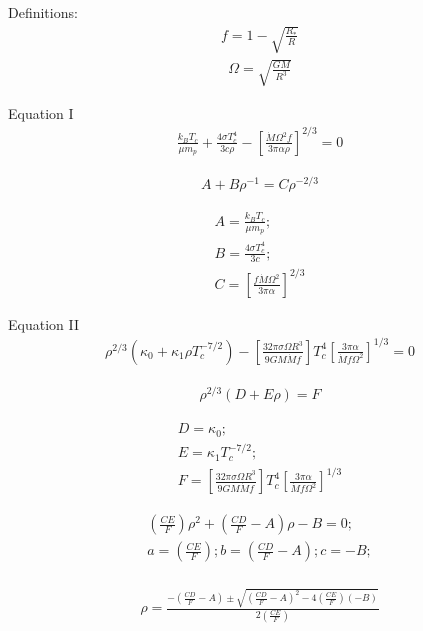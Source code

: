 Definitions:
\begin{align*}
f=1-\sqrt{\frac{R_*}{R}}
\end{align*}
\begin{align*}
\Omega=\sqrt{\frac{GM}{R^3}}
\end{align*}

Equation I
\begin{align*}
\frac{k_B T_c}{\mu m_p} + \frac{4\sigma T_c^4}{3c\rho}-\left[\frac{\dot{M}\Omega^2f}{3\pi\alpha\rho}\right]^{2/3}=0
\end{align*}

\begin{align*}
    A+B\rho^{-1}=C\rho^{-2/3}
\end{align*}

\[
\begin{array}{l}
A=\frac{k_B T_c}{\mu m_p}; \\ 
B=\frac{4\sigma T_c^4}{3c}; \\ 
C=\left[\frac{f\dot{M}\Omega^2}{3\pi\alpha}\right]^{2/3}
\end{array}
\]

Equation II
\begin{align*}
\rho^{2/3}(\kappa_0+\kappa_1\rho T_c^{-7/2})-\left[\frac{32\pi\sigma\Omega R^3}{9GM\dot{M}f}\right]T_c^4\left[\frac{3\pi\alpha}{\dot{M}f\Omega^2}\right]^{1/3}=0
\end{align*}

\begin{align*}
    \rho^{2/3}(D+E\rho)=F
\end{align*}

\[
\begin{array}{l}
D=\kappa_0; \\
E=\kappa_1 T_c^{-7/2}; \\
F=\left[\frac{32\pi\sigma\Omega R^3}{9GM\dot{M}f}\right]T_c^4\left[\frac{3\pi\alpha}{\dot{M}f\Omega^2}\right]^{1/3} 
\end{array}
\]

\[
\begin{array}{c}
\left(\frac{CE}{F}\right)\rho^2+\left(\frac{CD}{F}-A\right)\rho-B=0; \\
a=\left(\frac{CE}{F}\right); b=\left(\frac{CD}{F}-A\right); c=-B; \\
\end{array}
\]

\begin{align*}
    \rho=\frac{-\left(\frac{CD}{F}-A\right)\pm\sqrt{\left(\frac{CD}{F}-A\right)^2-4\left(\frac{CE}{F}\right)(-B)}}{2\left(\frac{CE}{F}\right)}
\end{align*}

